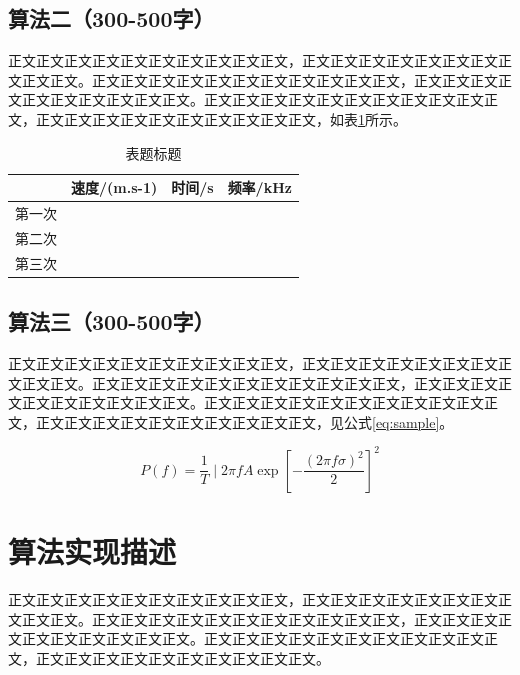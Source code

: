 \documentclass{article}
\begin{document}
\subsection{算法二（300-500字）}
正文正文正文正文正文正文正文正文正文正文，正文正文正文正文正文正文正文正文正文正文。正文正文正文正文正文正文正文正文正文正文正文，正文正文正文正文正文正文正文正文正文正文。正文正文正文正文正文正文正文正文正文正文正文，正文正文正文正文正文正文正文正文正文正文，如表\ref{table:sanple}所示。

\begin{table}[H]
\caption{表题标题}
\begin{center}\label{table:sanple}
\begin{tabular}{|c|r|r|r|}
\hline
    & \multicolumn{1}{c|}{速度/(m.s-1)} & \multicolumn{1}{c|}{时间/s} & \multicolumn{1}{c|}{频率/kHz} \\ \hline
第一次 &                                 &                           &                             \\ \hline
第二次 &                                 &                           &                             \\ \hline
第三次 &                                 &                           &                             \\ \hline
\end{tabular}
\end{center}
\end{table}

\subsection{算法三（300-500字）}
正文正文正文正文正文正文正文正文正文正文，正文正文正文正文正文正文正文正文正文正文。正文正文正文正文正文正文正文正文正文正文正文，正文正文正文正文正文正文正文正文正文正文。正文正文正文正文正文正文正文正文正文正文正文，正文正文正文正文正文正文正文正文正文正文，见公式\ref{eq:sample}。

\begin{equation}\label{eq:sample}
P(f)=\frac{1}{T} \mid 2 \pi f A \exp \left[-\frac{(2 \pi f \sigma)^{2}}{2}\right]^{2}
\end{equation}

\section{算法实现描述}
正文正文正文正文正文正文正文正文正文正文，正文正文正文正文正文正文正文正文正文正文。正文正文正文正文正文正文正文正文正文正文正文，正文正文正文正文正文正文正文正文正文正文。正文正文正文正文正文正文正文正文正文正文正文，正文正文正文正文正文正文正文正文正文正文。
\end{document}
